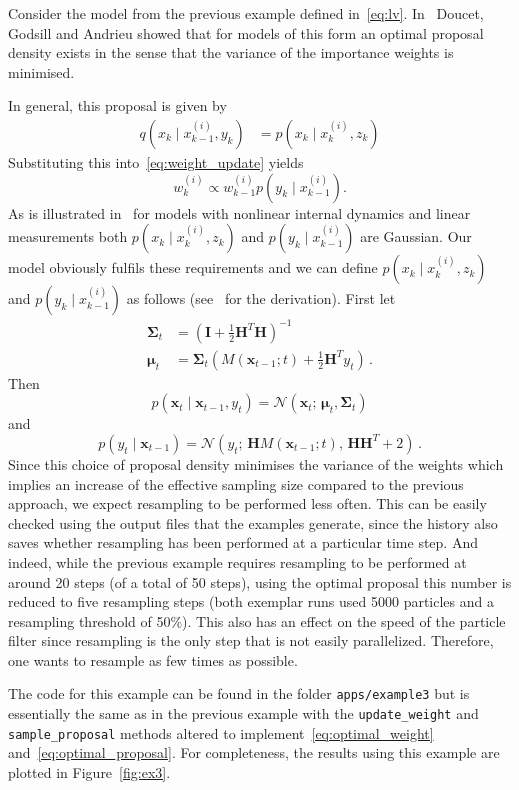 \begin{example}\label{ex:lv2}
  Consider the model from the previous example defined
  in~\eqref{eq:lv}. In~\cite{Doucet2000} Doucet, Godsill and Andrieu
  showed that for models of this form an optimal proposal density
  exists in the sense that the variance of the importance weights is
  minimised.

  In general, this proposal is given by
  \begin{align*}
    q(x_k \mid x^{(i)}_{k-1}, y_k) &= p(x_k \mid x_k^{(i)}, z_k)
  \end{align*}
  Substituting this into~\eqref{eq:weight_update} yields
  \[
    w_k^{(i)} \propto w_{k-1}^{(i)} p(y_k \mid x_{k-1}^{(i)}).
  \]
  As is illustrated in~\cite[Example 3]{Doucet2000} for models with
  nonlinear internal dynamics and linear measurements both
  $p(x_k \mid x_k^{(i)}, z_k)$ and $p(y_k \mid x_{k-1}^{(i)})$ are
  Gaussian. Our model obviously fulfils these requirements and we can
  define $p(x_k \mid x_k^{(i)}, z_k)$ and $p(y_k \mid x_{k-1}^{(i)})$
  as follows (see~\cite{Doucet2000} for the derivation). First let
  \begin{align*}
    \bm{\Sigma}_t &= {\left(\bm{I} + \frac{1}{2} \bm{H}^T \bm{H}\right)}^{-1}\,\\
    \bm{\mu}_t &= \bm{\Sigma}_t \left(M(\bm{x}_{t-1}; t) + \frac{1}{2} \bm{H}^T y_t\right)\,.
  \end{align*}
  Then
  \begin{equation}
    \label{eq:optimal_proposal}
    p(\bm{x}_t \mid \bm{x}_{t-1}, y_t) = \mathcal{N}(\bm{x}_t;\, \bm{\mu}_t, \bm{\Sigma}_t)
  \end{equation}
  and
  \begin{equation}
    \label{eq:optimal_weight}
    p(y_t \mid \bm{x}_{t-1}) = \mathcal{N}(y_t; \, \bm{H} M(\bm{x}_{t-1}; t), \,  \bm{H} \bm{H}^T + 2)\,.
  \end{equation}
  Since this choice of proposal density minimises the variance of the
  weights which implies an increase of the effective sampling size
  compared to the previous approach, we expect resampling to be
  performed less often. This can be easily checked using the output
  files that the examples generate, since the history also saves
  whether resampling has been performed at a particular time step. And
  indeed, while the previous example requires resampling to be
  performed at around 20 steps (of a total of 50 steps), using the
  optimal proposal this number is reduced to five resampling steps
  (both exemplar runs used 5000 particles and a resampling threshold
  of 50\%). This also has an effect on the speed of the particle
  filter since resampling is the only step that is not easily
  parallelized. Therefore, one wants to resample as few times as
  possible.

  The code for this example can be found in the folder
  \texttt{apps/example3} but is essentially the same as in the
  previous example with the \texttt{update\_weight} and
  \texttt{sample\_proposal} methods altered to
  implement~\eqref{eq:optimal_weight} and~\eqref{eq:optimal_proposal}.
  For completeness, the results using this example are plotted in
  Figure~\ref{fig:ex3}.
\end{example}

